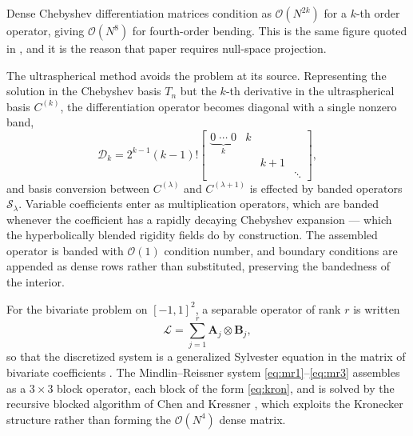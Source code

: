 \documentclass[11pt,a4paper]{article}
\theoremstyle{definition}
\numberwithin{equation}{section}
\begin{document}
Dense Chebyshev differentiation matrices condition as $\mathcal{O}(N^{2k})$ for a $k$-th order operator, giving $\mathcal{O}(N^8)$ for fourth-order bending. This is the same figure quoted in \cite{knox2026passes}, and it is the reason that paper requires null-space projection.

The ultraspherical method \cite{olver2013} avoids the problem at its source. Representing the solution in the Chebyshev basis $T_n$ but the $k$-th derivative in the ultraspherical basis $C^{(k)}$, the differentiation operator becomes diagonal with a single nonzero band,
\begin{equation}
\label{eq:ultraD}
\mathcal{D}_k = 2^{k-1}(k-1)! \begin{bmatrix}
\underbrace{0 \;\cdots\; 0}_{k} & k & & \\
 & & k+1 & \\
 & & & \ddots
\end{bmatrix},
\end{equation}
and basis conversion between $C^{(\lambda)}$ and $C^{(\lambda+1)}$ is effected by banded operators $\mathcal{S}_\lambda$. Variable coefficients enter as multiplication operators, which are banded whenever the coefficient has a rapidly decaying Chebyshev expansion --- which the hyperbolically blended rigidity fields do by construction. The assembled operator is banded with $\mathcal{O}(1)$ condition number, and boundary conditions are appended as dense rows rather than substituted, preserving the bandedness of the interior.

For the bivariate problem on $[-1,1]^2$, a separable operator of rank $r$ is written
\begin{equation}
\label{eq:kron}
\mathcal{L} = \sum_{j=1}^{r} \mathbf{A}_j \otimes \mathbf{B}_j,
\end{equation}
so that the discretized system is a generalized Sylvester equation in the matrix of bivariate coefficients \cite{townsend2015}. The Mindlin--Reissner system \cref{eq:mr1}--\cref{eq:mr3} assembles as a $3\times3$ block operator, each block of the form \cref{eq:kron}, and is solved by the recursive blocked algorithm of Chen and Kressner \cite{chen2020}, which exploits the Kronecker structure rather than forming the $\mathcal{O}(N^4)$ dense matrix.
\end{document}
